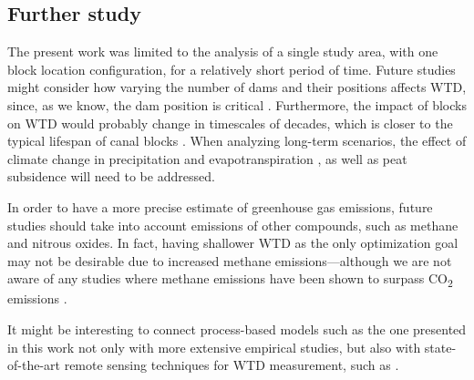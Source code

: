 \documentclass[bg, manuscript]{copernicus}
\begin{document}
\subsection{Further study}
The present work was limited to the analysis of a single study area, with one block location configuration, for a relatively short period of time.
Future studies might consider how varying the number of dams and their positions affects WTD, since, as we know,  the dam position is critical \citep{urzainkiCanalBlockingOptimization2020}.
Furthermore, the impact of blocks on WTD would probably change in timescales of decades, which is closer to the typical lifespan of canal blocks \citep{ritzemaCanalBlockingStrategies2014, dohongReviewTechniquesEffective2018}.
When analyzing long-term scenarios, the effect of climate change in precipitation and evapotranspiration \citep{gallego-salaLatitudinalLimitsPredicted2018, wangPotentialShiftCarbon2018, caiIncreasingFrequencyExtreme2014, portnerClimateChange20222022}, as well as peat subsidence \citep{evansRatesSpatialVariability2019, hoytWidespreadSubsidenceCarbon2020, evansLongtermTrajectoryTemporal2022} will need to be addressed.

In order to have a more precise estimate of greenhouse gas emissions, future studies should take into account emissions of other compounds, such as methane and nitrous oxides.
In fact, having shallower WTD as the only optimization goal may not be desirable due to increased methane emissions---although we are not aware of any studies where methane emissions have been shown to surpass CO\textsubscript{2} emissions \citep{tehSeasonalVariabilityMethane2017, wongMicrometeorologicalMeasurementMethane2018, planas-clarkeEffectWaterTable2020, deshmukhImpactForestPlantation2020, deshmukhConservationSlowsEmission2021, kiuruPeatMacroporeNetworks2022, zouRewettingGlobalWetlands2022, lestariRewettingTropicalPeatlands2022}.

It might be interesting to connect process-based models such as the one presented in this work not only with more extensive empirical studies, but also with state-of-the-art remote sensing techniques for WTD measurement, such as \cite{hikouei2023}.
\end{document}
